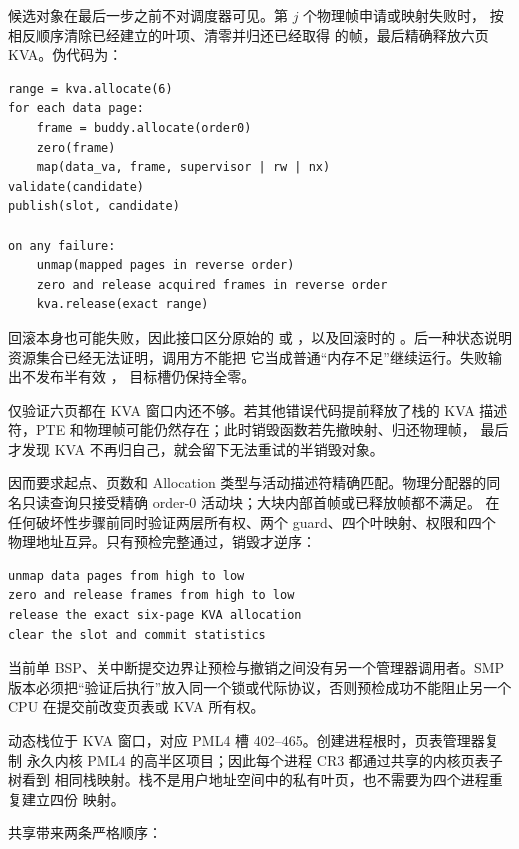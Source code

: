 候选对象在最后一步之前不对调度器可见。第 \(j\) 个物理帧申请或映射失败时，
 按相反顺序清除已经建立的叶项、清零并归还已经取得
的帧，最后精确释放六页 KVA。伪代码为：

\begin{verbatim}
range = kva.allocate(6)
for each data page:
    frame = buddy.allocate(order0)
    zero(frame)
    map(data_va, frame, supervisor | rw | nx)
validate(candidate)
publish(slot, candidate)

on any failure:
    unmap(mapped pages in reverse order)
    zero and release acquired frames in reverse order
    kva.release(exact range)
\end{verbatim}

回滚本身也可能失败，因此接口区分原始的
 或 ，以及回滚时的
。后一种状态说明资源集合已经无法证明，调用方不能把
它当成普通“内存不足”继续运行。失败输出不发布半有效 ，
目标槽仍保持全零。

仅验证六页都在 KVA 窗口内还不够。若其他错误代码提前释放了栈的 KVA
描述符，PTE 和物理帧可能仍然存在；此时销毁函数若先撤映射、归还物理帧，
最后才发现 KVA 不再归自己，就会留下无法重试的半销毁对象。

 因而要求起点、页数和
Allocation 类型与活动描述符精确匹配。物理分配器的同名只读查询只接受精确
order-0 活动块；大块内部首帧或已释放帧都不满足。 在
任何破坏性步骤前同时验证两层所有权、两个 guard、四个叶映射、权限和四个
物理地址互异。只有预检完整通过，销毁才逆序：

\begin{verbatim}
unmap data pages from high to low
zero and release frames from high to low
release the exact six-page KVA allocation
clear the slot and commit statistics
\end{verbatim}

当前单 BSP、关中断提交边界让预检与撤销之间没有另一个管理器调用者。SMP
版本必须把“验证后执行”放入同一个锁或代际协议，否则预检成功不能阻止另一个
CPU 在提交前改变页表或 KVA 所有权。

动态栈位于 KVA 窗口，对应 PML4 槽 402--465。创建进程根时，页表管理器复制
永久内核 PML4 的高半区项目；因此每个进程 CR3 都通过共享的内核页表子树看到
相同栈映射。栈不是用户地址空间中的私有叶页，也不需要为四个进程重复建立四份
映射。

共享带来两条严格顺序：

